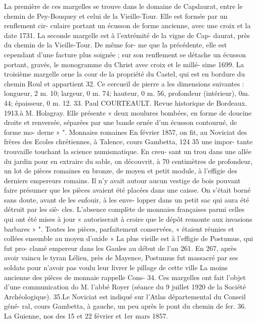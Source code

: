 \documentclass[a4paper,11pt]{book}
\begin{document}
La première de ces margelles se trouve dans le domaine
de Capdaurat, entre le chemin de Pey-Bouquey et celui
de la Vieille-Tour. Elle est formée par un renflement cir-
culaire portant un écusson de forme ancienne, avec une
croix et la date 1731.
La seconde margelle est à l'extrémité de la vigne de Cap-
daurat, près du chemin de la Vieille-Tour. De même for-
me que la précédente, elle est cependant d'une facture plus
soignée ; sur son renflement se détache un écusson portant,
gravés, le monogramme du Christ avec croix et le millé-
sime 1699.
La troisième margelle orne la cour de la propriété du
Castel, qui est en bordure du chemin Roul et appartient
32. Ce cercueil de pierre a les dimensions suivantes : longueur,
2 m. 10; largeur, 0 m. 74; hauteur, 0 m. 56, profondeur (intérieur), 0m. 44;
épaisseur, 0 m. 12.
33. Paul COURTEAULT. Revue historique de Bordeaux. 1913.à M. Holagray. Elle présente « deux moulures bombées,
en forme de doucine droite et renversée, séparées par une
bande ornée d'un écusson contourné, de forme mo-
derne » ".
Monnaies romaines
En février 1857, on fit, au Noviciat des frères des Ecoles
chrétiennes, à Talence, cours Gambetta, 124 35 une impor-
tante trouvaille touchant la science numismatique. En creu-
sant un trou dans une allée du jardin pour en extraire
du sable, on découvrit, à 70 centimètres de profondeur,
un lot de pièces romaines en bronze, de moyen et petit
module, à l'effigie des derniers empereurs romains. Il n'y
avait autour aucun vestige de bois pouvant faire présumer
que les pièces avaient été placées dans une caisse. On
s'était borné sans doute, avant de les enfouir, à les enve-
lopper dans un petit sac qui aura été détruit par les siè-
cles. L'absence complète de monnaies françaises parmi
celles qui ont été mises à jour « autoriserait à croire que
le dépôt remonte aux invasions barbares » ".
Toutes les pièces, parfaitement conservées, « étaient
réunies et collées ensemble au moyen d'oxide »
La plus vieille est à l'effigie de Postumus, qui fut pro-
clamé empereur dans les Gaules au début de l'an 261. En
267, après avoir vaincu le tyran Lélien, près de Mayence,
Postumus fut massacré par ses soldats pour n'avoir pas
voulu leur livrer le pillage de cette ville
La moins ancienne des pièces de monnaie rappelle Cons-
34. Ces margelles ont fait l'objet d'une communication do M. l'abbé
Royer (séance du 9 juillet 1920 de la Société Archéologique).
35.Le Noviciat est indiqué sur l'Atlas départemental du Conseil géné-
ral, cours Gambetta, à gauche, un peu après le pont du chemin de fer.
36. La Guienne, nos des 15 et 22 février et 1er mars 1857.
\end{document}
